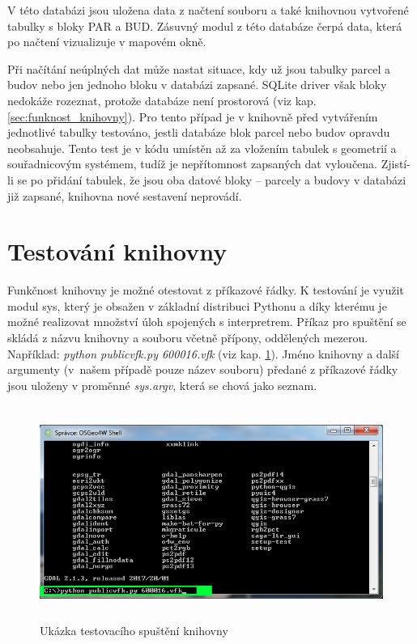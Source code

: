 V této databázi jsou uložena data z načtení  souboru a také
knihovnou vytvořené tabulky s bloky PAR a BUD. Zásuvný modul z této
databáze čerpá data, která po načtení vizualizuje v mapovém okně.

Při načítání neúplných dat  může nastat situace, kdy už jsou
tabulky parcel a budov nebo jen jednoho bloku v databázi
zapsané. SQLite driver však bloky nedokáže rozeznat, protože databáze
není prostorová (viz kap. \ref{sec:funknost_knihovny}). Pro tento
případ je v knihovně před vytvářením jednotlivé tabulky testováno,
jestli databáze blok parcel nebo budov opravdu neobsahuje. Tento test
je v kódu umístěn až za vložením tabulek s geometrií a souřadnicovým
systémem, tudíž je nepřítomnost zapsaných dat vyloučena. Zjistí-li se
po přidání tabulek, že jsou oba datové bloky -- parcely a budovy v
databázi již zapsané, knihovna nové sestavení neprovádí.

\section{Testování knihovny}

Funkčnost knihovny je možné otestovat z příkazové řádky. K testování
je využit modul sys, který je obsažen v základní distribuci Pythonu a
díky kterému je možné realizovat množství úloh spojených s
interpretrem. Příkaz pro spuštění se skládá z názvu knihovny a
 souboru včetně přípony, oddělených mezerou. Například:
\textit{python publicvfk.py 600016.vfk} (viz
kap. \ref{fig:testovani_ukazka}). Jméno knihovny a další argumenty
(v~našem případě pouze název  souboru) předané z příkazové
řádky jsou uloženy v proměnné \textit{sys.argv}, která se chová jako
seznam.

\begin{figure}[H]
	 \centering
      \includegraphics[height=7cm]{./pictures/testovani_ukazka.png}
      \caption{Ukázka testovacího spuštění knihovny}
      \label{fig:testovani_ukazka}
  \end{figure}

